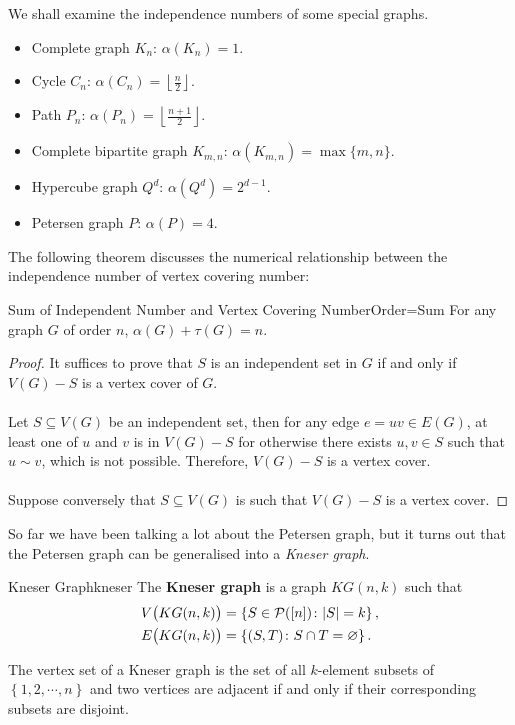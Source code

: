 \documentclass[math, code]{amznotes}
\theoremstyle{remark}
\begin{document}
We shall examine the independence numbers of some special graphs.
\begin{itemize}
    \item Complete graph $K_n$: $\alpha(K_n) = 1$.
    \item Cycle $C_n$: $\alpha(C_n) = \left\lfloor\frac{n}{2}\right\rfloor$.
    \item Path $P_n$: $\alpha(P_n) = \left\lfloor\frac{n + 1}{2}\right\rfloor$.
    \item Complete bipartite graph $K_{m, n}$: $\alpha(K_{m, n}) = \max\{m, n\}$.
    \item Hypercube graph $Q^d$: $\alpha(Q^d) = 2^{d - 1}$.
    \item Petersen graph $P$: $\alpha(P) = 4$.
\end{itemize}
The following theorem discusses the numerical relationship between the independence number of vertex covering number:
\begin{probox}{Sum of Independent Number and Vertex Covering Number}{Order=Sum}
    For any graph $G$ of order $n$, $\alpha(G) + \tau(G) = n$.
    \tcblower
    \begin{proof}
        It suffices to prove that $S$ is an independent set in $G$ if and only if $V(G) - S$ is a vertex cover of $G$.
        \\\\
        Let $S \subseteq V(G)$ be an independent set, then for any edge $e = uv \in E(G)$, at least one of $u$ and $v$ is in $V(G) - S$ for otherwise there exists $u, v \in S$ such that $u \sim v$, which is not possible. Therefore, $V(G) - S$ is a vertex cover.
        \\\\
        Suppose conversely that $S \subseteq V(G)$ is such that $V(G) - S$ is a vertex cover.
    \end{proof}
\end{probox}
So far we have been talking a lot about the Petersen graph, but it turns out that the Petersen graph can be generalised into a \textit{Kneser graph}.
\begin{dfnbox}{Kneser Graph}{kneser}
    The {\color{red} \textbf{Kneser graph}} is a graph $KG(n, k)$ such that 
    \begin{align*}
        V\bigl(KG(n, k)\bigr) & = \left\{S \in \mathcal{P}([n]) \colon {\left\lvert {S} \right\rvert} = k\right\}, \\
        E\bigl(KG(n, k)\bigr) & = \left\{(S, T) \colon S \cap T = \varnothing\right\}.
    \end{align*}
\end{dfnbox}
The vertex set of a Kneser graph is the set of all $k$-element subsets of $\left\{1, 2, \cdots, n\right\}$ and two vertices are adjacent if and only if their corresponding subsets are disjoint.
\end{document}

